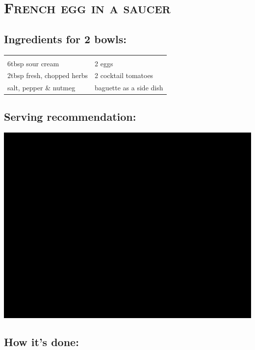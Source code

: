 \section{\textsc{French egg in a saucer}}

\subsection*{Ingredients for 2 bowls:}

\begin{tabular}{p{7.5cm} p{7.5cm}}
	& \\
	6tbsp sour cream & 2 eggs \\
	2tbsp fresh, chopped herbs  & 2 cocktail tomatoes \\
  salt, pepper \& nutmeg & baguette as a side dish
\end{tabular}

\subsection*{Serving recommendation:}

\includegraphics[width=\textwidth]{img/ph.jpg} \cite{eiimnaepfchen}

\subsection*{How it's done:}

